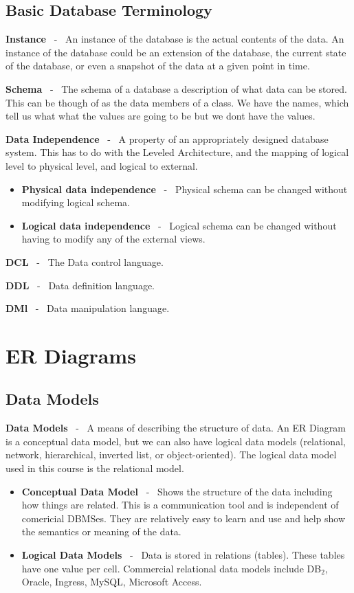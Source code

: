 \documentclass{report}
\begin{document}
    \subsection*{Basic Database Terminology}
\item \textbf{Instance} \ - \ An instance of the database is the actual contents of the data. An instance of the database could be an extension of the database, the current state of the database, or even a snapshot of the data at a given point in time.
\item \textbf{Schema} \ - \ The schema of a database a description of what data can be stored. This can be though of as the data members of a class. We have the names, which tell us what what the values are going to be but we dont have the values.
\item \textbf{Data Independence} \ - \ A property of an appropriately designed database system. This has to do with the Leveled Architecture, and the mapping of logical level to physical level, and logical to external.
    \begin{itemize}[label=$\circ$]
        \item \textbf{Physical data independence} \ - \ Physical schema can be changed without modifying logical schema.
        \item \textbf{Logical data independence } \ - \ Logical schema can be changed without having to modify any of the external views.
    \end{itemize}
    \item \textbf{DCL} \ - \ The Data control language.
    \item  \textbf{DDL} \ - \ Data definition language.
    \item \textbf{DMl} \ - \ Data manipulation language.
        \section{ER Diagrams}
        \subsection*{Data Models}
    \item \textbf{Data Models} \ - \ A means of describing the structure of data. An ER Diagram is a conceptual data model, but we can also have logical data models (relational, network, hierarchical, inverted list, or object-oriented). The logical data model used in this course is the relational model.
    \begin{itemize}[label=$\circ$]
        \item \textbf{Conceptual Data Model} \ - \ Shows the structure of the data including how things are related. This is a communication tool and is independent of comericial DBMSes. They are relatively easy to learn and use and help show the semantics or meaning of the data. 
        \item \textbf{Logical Data Models} \ - \ Data is stored in relations (tables). These tables have one value per cell. Commercial relational data models include DB$_2$, Oracle, Ingress, MySQL, Microsoft Access.
    \end{itemize}
\end{document}
